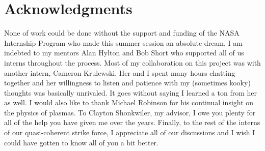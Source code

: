 \documentclass{article}
\begin{document}
\section*{Acknowledgments}

None of work could be done without the support and funding of the NASA Internship Program who made this summer session an absolute dream. I am indebted to my mentors Alan Hylton and Bob Short who supported all of us interns throughout the process. Most of my collaboration on this project was with another intern, Cameron Krulewski. Her and I spent many hours chatting together and her willingness to listen and patience with my (sometimes kooky) thoughts was basically unrivaled. It goes without saying I learned a ton from her as well. I would also like to thank Michael Robinson for his continual insight on the physics of plasmas. To Clayton Shonkwiler, my advisor, I owe you plenty for all of the help you have given me over the years. Finally, to the rest of the interns of our quasi-coherent strike force, I appreciate all of our discussions and I wish I could have gotten to know all of you a bit better.


\end{document}
